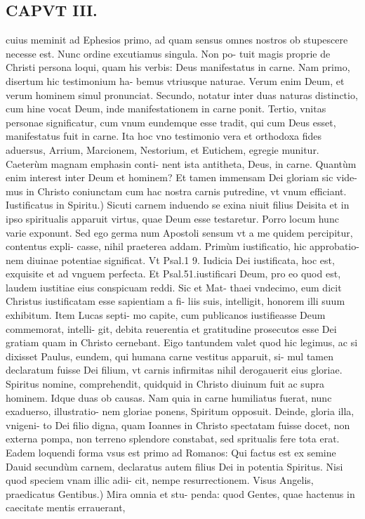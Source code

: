 \documentclass{article}
\begin{document}
\begin{pages}
\section*{CAPVT III. }
\marginpar{[ p.41 ]}\pstart cuius meminit ad Ephesios primo, ad quam sensus omnes nostros ob stupescere necesse est. Nunc ordine excutiamus singula. Non po- tuit magis proprie de Christi persona loqui, quam his verbis: Deus manifestatus in carne. Nam primo, disertum hic testimonium ha- bemus vtriusque naturae. Verum enim Deum, et verum hominem simul pronunciat. Secundo, notatur inter duas naturas distinctio, cum hine vocat Deum, inde manifestationem in carne ponit. Tertio, vnitas personae significatur, cum vnum eundemque esse tradit, qui cum Deus esset, manifestatus fuit in carne. Ita hoc vno testimonio vera et orthodoxa fides aduersus, Arrium, Marcionem, Nestorium, et Eutichem, egregie munitur. Caeterùm magnam emphasin conti- nent ista antitheta, Deus, in carne. Quantùm enim interest inter Deum et hominem? Et tamen immensam Dei gloriam sic vide- mus in Christo coniunctam cum hac nostra carnis putredine, vt vnum efficiant.  \pend\pstart Iustificatus in Spiritu.) Sicuti carnem induendo se exina niuit filius Deisita et in ipso spiritualis apparuit virtus, quae Deum esse testaretur. Porro locum hunc varie exponunt. Sed ego germa num Apostoli sensum vt a me quidem percipitur, contentus expli- casse, nihil praeterea addam. Primùm iustificatio, hic approbatio- nem diuinae potentiae significat. Vt Psal.1 9. Iudicia Dei iustificata, hoc est, exquisite et ad vnguem perfecta. Et Psal.51.iustificari Deum, pro eo quod est, laudem iustitiae eius conspicuam reddi. Sic et Mat- thaei vndecimo, eum dicit Christus iustificatam esse sapientiam a fi- liis suis, intelligit, honorem illi suum exhibitum. Item Lucas septi- mo capite, cum publicanos iustifieasse Deum commemorat, intelli- git, debita reuerentia et gratitudine prosecutos esse Dei gratiam quam in Christo cernebant. Eigo tantundem valet quod hic legimus, ac si dixisset Paulus, eundem, qui humana carne vestitus apparuit, si- mul tamen declaratum fuisse Dei filium, vt carnis infirmitas nihil derogauerit eius gloriae. Spiritus nomine, comprehendit, quidquid in Christo diuinum fuit ac supra hominem. Idque duas ob causas. Nam quia in carne humiliatus fuerat, nunc exaduerso, illustratio- nem gloriae ponens, Spiritum opposuit. Deinde, gloria illa, vnigeni- to Dei filio digna, quam Ioannes in Christo spectatam fuisse docet, non externa pompa, non terreno splendore constabat, sed spritualis fere tota erat. Eadem loquendi forma vsus est primo ad Romanos: Qui factus est ex semine Dauid secundùm carnem, declaratus autem filius Dei in potentia Spiritus. Nisi quod speciem vnam illic adii- cit, nempe resurrectionem.  \pend\pstart Visus Angelis, praedicatus Gentibus.) Mira omnia et stu- penda: quod Gentes, quae hactenus in caecitate mentis errauerant,  \pend

\end{pages}
\end{document}
